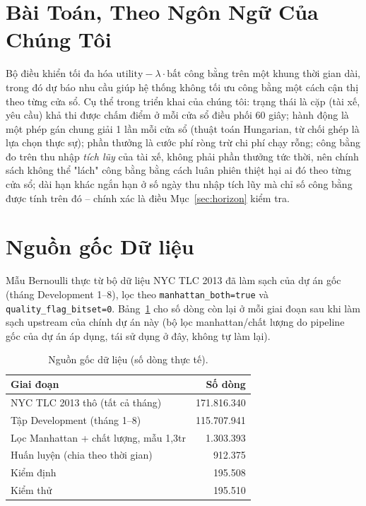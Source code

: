 \documentclass[10pt,twocolumn,a4paper]{article}
\begin{document}
\section{Bài Toán, Theo Ngôn Ngữ Của Chúng Tôi}
Bộ điều khiển tối đa hóa $\text{utility} - \lambda\cdot\text{bất công bằng}$
trên một khung thời gian dài, trong đó dự báo nhu cầu giúp hệ thống không tối
ưu công bằng một cách cận thị theo từng cửa sổ. Cụ thể trong triển khai của
chúng tôi: trạng thái là cặp (tài xế, yêu cầu) khả thi được chấm điểm ở mỗi
cửa sổ điều phối 60 giây; hành động là một phép gán chung giải 1 lần mỗi cửa
sổ (thuật toán Hungarian, từ chối ghép là lựa chọn thực sự); phần thưởng là
cước phí ròng trừ chi phí chạy rỗng; công bằng đo trên thu nhập
\emph{tích lũy} của tài xế, không phải phần thưởng tức thời, nên chính sách
không thể "lách" công bằng bằng cách luân phiên thiệt hại ai đó theo từng cửa
sổ; dài hạn khác ngắn hạn ở số ngày thu nhập tích lũy mà chỉ số công bằng
được tính trên đó -- chính xác là điều Mục~\ref{sec:horizon} kiểm tra.

\section{Nguồn gốc Dữ liệu}
Mẫu Bernoulli thực từ bộ dữ liệu NYC TLC 2013 đã làm sạch của dự án gốc
(tháng Development 1--8), lọc theo \texttt{manhattan\_both=true} và
\texttt{quality\_flag\_bitset=0}. Bảng~\ref{tab:lineage} cho số dòng còn lại
ở mỗi giai đoạn sau khi làm sạch upstream của chính dự án này (bộ lọc
manhattan/chất lượng do pipeline gốc của dự án áp dụng, tái sử dụng ở đây,
không tự làm lại).

\begin{table}[h!]
\centering
\caption{Nguồn gốc dữ liệu (số dòng thực tế).}
\label{tab:lineage}
\footnotesize
\begin{tabular}{@{}lr@{}}
\toprule
Giai đoạn & Số dòng \\
\midrule
NYC TLC 2013 thô (tất cả tháng) & 171.816.340 \\
Tập Development (tháng 1--8) & 115.707.941 \\
Lọc Manhattan + chất lượng, mẫu 1,3tr & 1.303.393 \\
Huấn luyện (chia theo thời gian) & 912.375 \\
Kiểm định & 195.508 \\
Kiểm thử & 195.510 \\
\bottomrule
\end{tabular}
\end{table}
\end{document}
